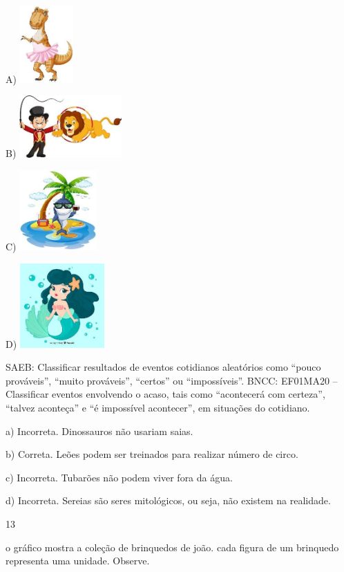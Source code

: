 A)
\includegraphics[width=0.80601in,height=1.16259in]{media/image115.jpg}

B)
\includegraphics[width=1.54211in,height=0.93118in]{media/image116.jpg}

C)
\includegraphics[width=1.16834in,height=1.20694in]{media/image117.jpg}

D)
\includegraphics[width=1.27083in,height=1.27083in]{media/image118.jpg}

SAEB: Classificar resultados de eventos cotidianos aleatórios como
``pouco prováveis'', ``muito prováveis'', ``certos'' ou ``impossíveis''.
BNCC: EF01MA20 -- Classificar eventos envolvendo o acaso, tais como
``acontecerá com certeza'', ``talvez aconteça'' e ``é impossível
acontecer'', em situações do cotidiano.

a) Incorreta. Dinossauros não usariam saias.

b) Correta. Leões podem ser treinados para realizar número de circo.

c) Incorreta. Tubarões não podem viver fora da água.

d) Incorreta. Sereias são seres mitológicos, ou seja, não existem na
realidade.

\num{13}

o gráfico mostra a coleção de brinquedos de joão. cada figura de um
brinquedo representa uma unidade. Observe.

